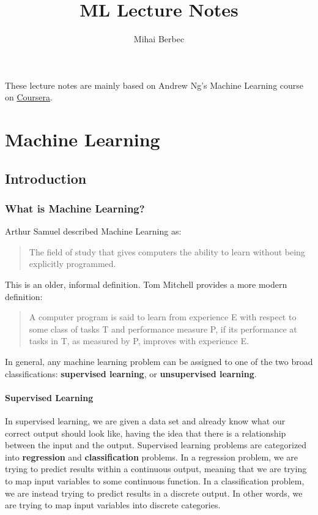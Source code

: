 \documentclass[a4paper,11pt]{report}
\begin{document}
\title{ML Lecture Notes}
\author{Mihai Berbec}
\maketitle

These lecture notes are mainly based on Andrew Ng's Machine Learning course on \href{https://www.coursera.org/learn/machine-learning/}{Coursera}.

\tableofcontents

\part{Machine Learning}

\chapter{Introduction}

\section{What is Machine Learning?}

Arthur Samuel described Machine Learning as:
\begin{quote}
The field of study that gives computers the ability to learn without being explicitly programmed.
\end{quote}

This is an older, informal definition. Tom Mitchell provides a more modern definition:
\begin{quote}
A computer program is said to learn from experience E with respect to some class of tasks T and performance measure P, if its performance at tasks in T, as measured by P, improves with experience E.
\end{quote}

In general, any machine learning problem can be assigned to one of the two broad classifications: \textbf{supervised learning}, or \textbf{unsupervised learning}.

\subsection*{Supervised Learning}

In supervised learning, we are given a data set and already know what our correct output should look like, having the idea that there is a relationship between the input and the output.
Supervised learning problems are categorized into \textbf{regression} and \textbf{classification} problems. In a regression problem, we are trying to predict results within a continuous output, meaning that we are trying to map input variables to some continuous function. In a classification problem, we are instead trying to predict results in a discrete output. In other words, we are trying to map input variables into discrete categories.
\end{document}
